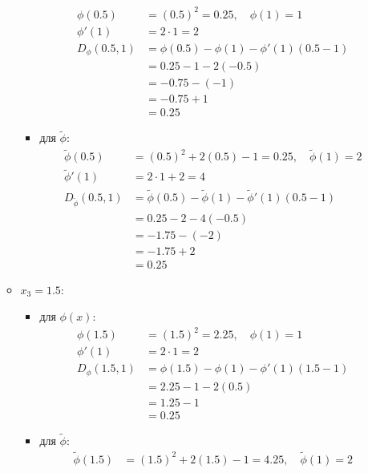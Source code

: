 \documentclass[12pt]{scrartcl}
\begin{document}
\begin{enumerate}
\begin{itemize}
\begin{itemize}
\begin{align*}
                \phi(0.5) &= (0.5)^2 = 0.25, \quad \phi(1) = 1 \\
                \phi'(1) &= 2 \cdot 1 = 2 \\
                D_{\phi}(0.5, 1) &= \phi(0.5) - \phi(1) - \phi'(1)(0.5 - 1) \\
                &= 0.25 - 1 - 2(-0.5) \\
                &= -0.75 - (-1) \\
                &= -0.75 + 1 \\
                &= 0.25
            \end{align*}
            \item для $\tilde{\phi}$:
            \begin{align*}
                \tilde{\phi}(0.5) &= (0.5)^2 + 2(0.5) - 1 = 0.25, \quad \tilde{\phi}(1) = 2 \\
                \tilde{\phi}'(1) &= 2 \cdot 1 + 2 = 4 \\
                D_{\tilde{\phi}}(0.5, 1) &= \tilde{\phi}(0.5) - \tilde{\phi}(1) - \tilde{\phi}'(1)(0.5 - 1) \\
                &= 0.25 - 2 - 4(-0.5) \\
                &= -1.75 - (-2) \\
                &= -1.75 + 2 \\
                &= 0.25
            \end{align*}
        \end{itemize}
        \item $x_{3} = 1.5 $:
        \begin{itemize}
            \item для $\phi(x)$:
            \begin{align*}
                \phi(1.5) &= (1.5)^2 = 2.25, \quad \phi(1) = 1 \\
                \phi'(1) &= 2 \cdot 1 = 2 \\
                D_{\phi}(1.5, 1) &= \phi(1.5) - \phi(1) - \phi'(1)(1.5 - 1) \\
                &= 2.25 - 1 - 2(0.5) \\
                &= 1.25 - 1 \\
                &= 0.25
            \end{align*}
            \item для $\tilde{\phi}$:
            \begin{align*}
                \tilde{\phi}(1.5) &= (1.5)^2 + 2(1.5) - 1 = 4.25, \quad \tilde{\phi}(1) = 2 \\

\end{align*}
\end{itemize}
\end{itemize}
\end{enumerate}
\end{document}
